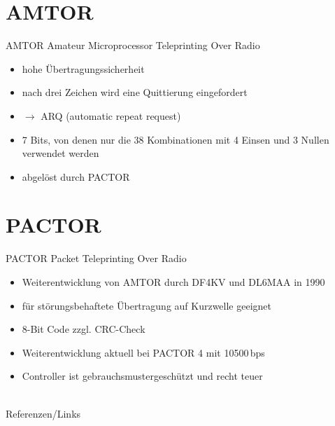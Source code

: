 \section{AMTOR}
\begin{frame}{AMTOR}
  Amateur Microprocessor Teleprinting Over Radio
  \begin{itemize}
    \item hohe Übertragungssicherheit
    \item nach drei Zeichen wird eine Quittierung eingefordert
    \item $\rightarrow$ ARQ (automatic repeat request)
    \item 7 Bits, von denen nur die 38 Kombinationen mit 4 Einsen und 3 Nullen verwendet werden
    \item abgelöst durch PACTOR
  \end{itemize}
\end{frame}

\section{PACTOR}
\begin{frame}{PACTOR}
  Packet Teleprinting Over Radio
  \begin{itemize}
    \item Weiterentwicklung von AMTOR durch DF4KV und DL6MAA in 1990
    \item für störungsbehaftete Übertragung auf Kurzwelle geeignet
    \item 8-Bit Code zzgl. CRC-Check
    \item Weiterentwicklung aktuell bei PACTOR 4 mit 10500\,bps
    \item Controller ist gebrauchsmustergeschützt und recht teuer
  \end{itemize}
\end{frame}


\renewcommand{\refname}{Referenzen}

\hypertarget{refs}{}
\textcolor{white}{} \\ %
\Large Referenzen/Links
\footnotesize

